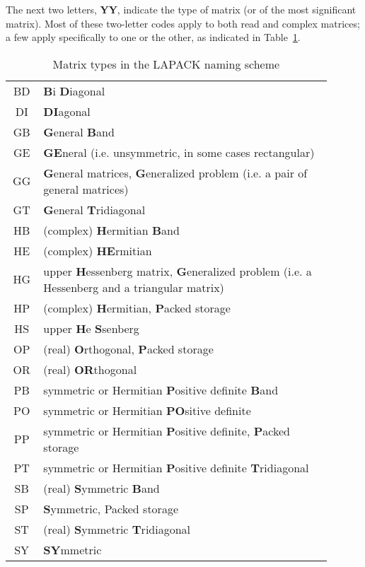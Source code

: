 \documentclass{article}
\renewcommand{\bf}[1]{\textsf{\bfseries \color{purple} #1}}
\begin{document}
The next two letters, \bf{YY}, indicate the type of matrix (or of the
most significant matrix). Most of these two-letter codes apply to both
read and complex matrices; a few apply specifically to one or the other,
as indicated in Table~\ref{tab.LNS}.

\begin{table}[ht]
    \centering
    \caption{Matrix types in the LAPACK naming scheme}
    \label{tab.LNS}
    \begin{tabular}{c p{0.9\linewidth}}
        \toprule
        BD & \bf{B}i\bf{D}iagonal\\
        DI & \bf{DI}agonal\\
        GB & \bf{G}eneral \bf{B}and \\ 
        GE & \bf{GE}neral (i.e. unsymmetric, in some cases rectangular)
        \\
        GG & \bf{G}eneral matrices, \bf{G}eneralized problem (i.e. a
        pair of general matrices) \\
        GT & \bf{G}eneral \bf{T}ridiagonal \\
        HB & (complex) \bf{H}ermitian \bf{B}and\\
        HE & (complex) \bf{HE}rmitian\\
        HG & upper \bf{H}essenberg matrix, \bf{G}eneralized problem
        (i.e. a Hessenberg and a triangular matrix)\\
        HP & (complex) \bf{H}ermitian, \bf{P}acked storage\\
        HS & upper \bf{H}e\bf{S}senberg\\
        OP & (real) \bf{O}rthogonal, \bf{P}acked storage\\
        OR & (real) \bf{OR}thogonal \\
        PB & symmetric or Hermitian \bf{P}ositive definite \bf{B}and \\
        PO & symmetric or Hermitian \bf{PO}sitive definite \\
        PP & symmetric or Hermitian \bf{P}ositive definite, \bf{P}acked storage \\
        PT & symmetric or Hermitian \bf{P}ositive definite \bf{T}ridiagonal \\
        SB & (real) \bf{S}ymmetric \bf{B}and \\
        SP & \bf{S}ymmetric, {P}acked storage \\
        ST & (real) \bf{S}ymmetric \bf{T}ridiagonal \\
        SY & \bf{SY}mmetric \\

\end{tabular}
\end{table}
\end{document}
